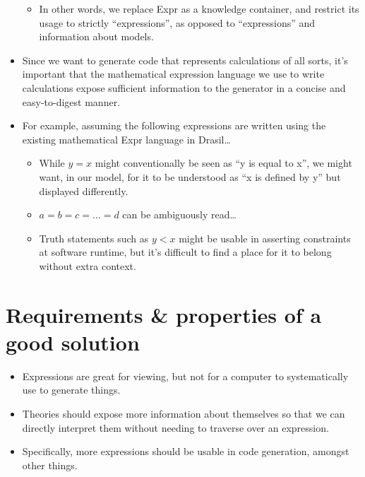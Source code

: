 \begin{itemize}
\begin{itemize}
		      \item In other words, we replace Expr as a knowledge container,
		            and restrict its usage to strictly ``expressions'', as
		            opposed to ``expressions'' and information about models.

	      \end{itemize}

	\item Since we want to generate code that represents calculations of all
	      sorts, it's important that the mathematical expression language we use
	      to write calculations expose sufficient information to the generator
	      in a concise and easy-to-digest manner.

	\item For example, assuming the following expressions are written using the
	      existing mathematical Expr language in Drasil\ldots{}
	      \begin{itemize}

		      \item While \(y = x\) might conventionally be seen as ``y is equal
		            to x'', we might want, in our model, for it to be understood
		            as ``x is defined by y'' but displayed differently.

		      \item \(a = b = c = ... = d\) can be ambiguously read\ldots{}

		      \item Truth statements such as \(y < x\) might be usable in
		            asserting constraints at software runtime, but it's
		            difficult to find a place for it to belong without extra
		            context.

	      \end{itemize}

\end{itemize}

\section{Requirements \& properties of a good solution}

\begin{itemize}

	\item Expressions are great for viewing, but not for a computer to
	      systematically use to generate things.

	\item Theories should expose more information about themselves so that we
	      can directly interpret them without needing to traverse over an
	      expression.

	\item Specifically, more expressions should be usable in code generation,
	      amongst other things.

\end{itemize}

